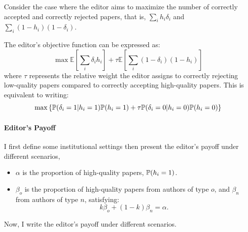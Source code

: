 \documentclass[12pt]{article}
\begin{document}
Consider the case where the editor aims to maximize the number of correctly
accepted and correctly rejected papers, that is, $\sum_i h_i\delta_i$ and
$\sum_i (1-h_i)(1-\delta_i)$.

The editor's objective function can be expressed as:
\begin{equation}
    \max \mathbb{E}[\sum_i \delta_i h_i] + \tau \mathbb{E}[\sum_i (1-\delta_i)(1-h_i)]
\end{equation}
where $\tau$ represents the relative weight the editor assigns to correctly rejecting low-quality papers compared to correctly accepting high-quality papers. This is equivalent to writing:
\[
    \max  \left\{ \mathbb{P}(\delta_i = 1|h_i = 1)\mathbb{P}(h_i = 1) +\tau \mathbb{P}(\delta_i = 0|h_i = 0)\mathbb{P}(h_i = 0)\right\}
\]

\paragraph{Editor's Payoff}
I first define some institutional settings then present the editor's payoff
under different scenarios,

\begin{itemize}
    \item $\alpha$ is the proportion of high-quality papers, $\mathbb{P}(h_i = 1)$.
    \item $\beta_o$ is the proportion of high-quality papers from authors of type $o$, and $\beta_n$ from authors of type $n$, satisfying:
          \[
              k \beta_o + (1 - k) \beta_n = \alpha.
          \]
\end{itemize}

Now, I write the editor's payoff under different scenarios.
\end{document}
